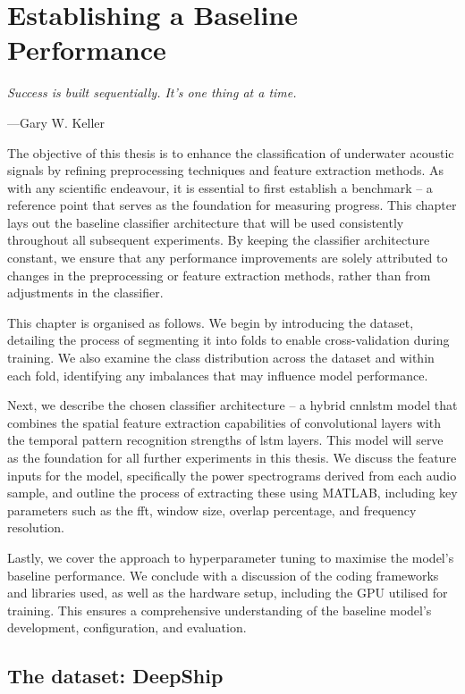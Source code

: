 \chapter{Establishing a Baseline Performance}

\epigraph{\itshape Success is built sequentially. It's one thing at a time.}{---Gary W. Keller}

The objective of this thesis is to enhance the classification of underwater acoustic signals by refining preprocessing techniques and feature extraction methods. As with any scientific endeavour, it is essential to first establish a benchmark -- a reference point that serves as the foundation for measuring progress. This chapter lays out the baseline classifier architecture that will be used consistently throughout all subsequent experiments. By keeping the classifier architecture constant, we ensure that any performance improvements are solely attributed to changes in the preprocessing or feature extraction methods, rather than from adjustments in the classifier.

This chapter is organised as follows. We begin by introducing the dataset, detailing the process of segmenting it into folds to enable cross-validation during training. We also examine the class distribution across the dataset and within each fold, identifying any imbalances that may influence model performance.

Next, we describe the chosen classifier architecture -- a hybrid \acrshort{cnnlstm} model that combines the spatial feature extraction capabilities of convolutional layers with the temporal pattern recognition strengths of \acrshort{lstm} layers. This model will serve as the foundation for all further experiments in this thesis. We discuss the feature inputs for the model, specifically the power spectrograms derived from each audio sample, and outline the process of extracting these using MATLAB, including key parameters such as the \acrshort{fft}, window size, overlap percentage, and frequency resolution. 

Lastly, we cover the approach to hyperparameter tuning to maximise the model's baseline performance. We conclude with a discussion of the coding frameworks and libraries used, as well as the hardware setup, including the GPU utilised for training. This ensures a comprehensive understanding of the baseline model's development, configuration, and evaluation.

\section{The dataset: DeepShip}

